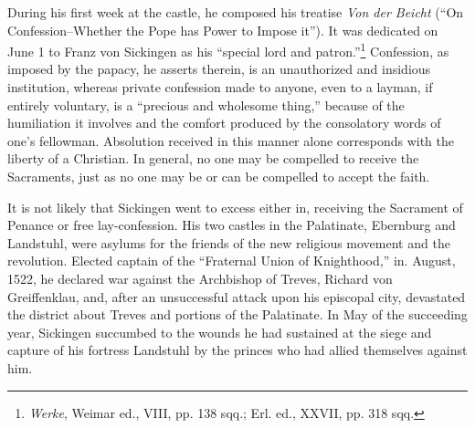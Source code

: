 During his first week at the castle, he composed his treatise \textit{Von
der Beicht} (“On Confession--Whether the Pope has Power to Impose
it”). It was dedicated on June 1 to Franz von Sickingen as
his “special lord and patron.”\footnote{\textit{Werke}, Weimar ed., VIII, pp. 138 sqq.; Erl. ed., XXVII, pp. 318 sqq.}
Confession, as imposed by the papacy,
he asserts therein, is an unauthorized and insidious institution, whereas
private confession made to anyone, even to a layman, if entirely
voluntary, is a “precious and wholesome thing,” because of the
humiliation it involves and the comfort produced by the consolatory
words of one’s fellowman. Absolution received in this manner alone
corresponds with the liberty of a Christian. In general, no one may
be compelled to receive the Sacraments, just as no one may be or can
be compelled to accept the faith.

It is not likely that Sickingen went to excess either in, receiving
the Sacrament of Penance or free lay-confession. His two castles
in the Palatinate, Ebernburg and Landstuhl, were asylums for the
friends of the new religious movement and the revolution. Elected
captain of the “Fraternal Union of Knighthood,” in. August, 1522,
he declared war against the Archbishop of Treves, Richard von
Greiffenklau, and, after an unsuccessful attack upon his episcopal
city, devastated the district about Treves and portions of the Palatinate.
In May of the succeeding year, Sickingen succumbed to the
wounds he had sustained at the siege and capture of his fortress
Landstuhl by the princes who had allied themselves against him.

